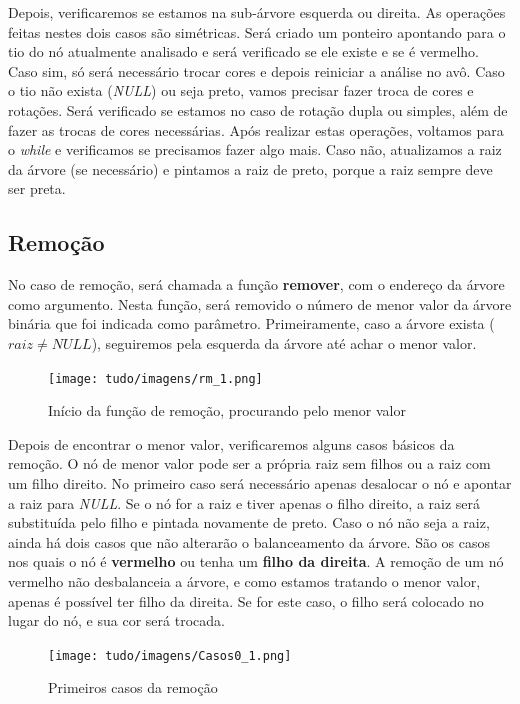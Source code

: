 \documentclass[a4paper,11pt]{article}
\begin{document}
        Depois, verificaremos se estamos na sub-árvore esquerda ou direita. As operações feitas nestes dois casos são simétricas. Será criado um ponteiro apontando para o tio do nó atualmente analisado e será verificado se ele existe e se é vermelho. Caso sim, só será necessário trocar cores e depois reiniciar a análise no avô. Caso o tio não exista (\textit{NULL}) ou seja preto, vamos precisar fazer troca de cores e rotações. Será verificado se estamos no caso de rotação dupla ou simples, além de fazer as trocas de cores necessárias. Após realizar estas operações, voltamos para o \textit{while} e verificamos se precisamos fazer algo mais. Caso não, atualizamos a raiz da árvore (se necessário) e pintamos a raiz de preto, porque a raiz sempre deve ser preta.

\medskip
\subsection{Remoção}
    No caso de remoção, será chamada a função \textbf{remover}, com o endereço da árvore como argumento. Nesta função, será removido o número de menor valor da árvore binária que foi indicada como parâmetro. Primeiramente, caso a árvore exista ($raiz \neq \textit{NULL}$), seguiremos pela esquerda da árvore até achar o menor valor.

    \begin{figure}[h]
    \centering
    \texttt{[image: tudo/imagens/rm\_1.png]}
    \caption{Início da função de remoção, procurando pelo menor valor}
    \label{imagem:rm_1}
    \end{figure}

    Depois de encontrar o menor valor, verificaremos alguns casos básicos da remoção. O nó de menor valor pode ser a própria raiz sem filhos ou a raiz com um filho direito. No primeiro caso será necessário apenas desalocar o nó e apontar a raiz para \textit{NULL}. Se o nó for a raiz e tiver apenas o filho direito, a raiz será substituída pelo filho e pintada novamente de preto. Caso o nó não seja a raiz, ainda há dois casos que não alterarão o balanceamento da árvore. São os casos nos quais o nó é \textbf{vermelho} ou tenha um \textbf{filho da direita}. A remoção de um nó vermelho não desbalanceia a árvore, e como estamos tratando o menor valor, apenas é possível ter filho da direita. Se for este caso, o filho será colocado no lugar do nó, e sua cor será trocada. 

    \begin{figure}[h]
    \centering
    \texttt{[image: tudo/imagens/Casos0\_1.png]}
    \caption{Primeiros casos da remoção}
    \label{imagem:casos0_1}
    \end{figure}
\end{document}
